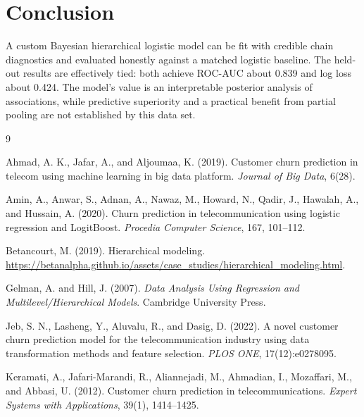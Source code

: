 \documentclass{article}
\begin{document}
\section{Conclusion}

A custom Bayesian hierarchical logistic model can be fit with credible chain diagnostics and evaluated honestly against a matched logistic baseline. The held-out results are effectively tied: both achieve ROC-AUC about 0.839 and log loss about 0.424. The model's value is an interpretable posterior analysis of associations, while predictive superiority and a practical benefit from partial pooling are not established by this data set.

\FloatBarrier

\begin{thebibliography}{9}

Ahmad, A. K., Jafar, A., and Aljoumaa, K. (2019).
\newblock Customer churn prediction in telecom using machine learning in big data platform.
\newblock \emph{Journal of Big Data}, 6(28).

Amin, A., Anwar, S., Adnan, A., Nawaz, M., Howard, N., Qadir, J., Hawalah, A., and Hussain, A. (2020).
\newblock Churn prediction in telecommunication using logistic regression and LogitBoost.
\newblock \emph{Procedia Computer Science}, 167, 101--112.

Betancourt, M. (2019).
\newblock Hierarchical modeling.
\newblock \url{https://betanalpha.github.io/assets/case_studies/hierarchical_modeling.html}.

Gelman, A. and Hill, J. (2007).
\newblock \emph{Data Analysis Using Regression and Multilevel/Hierarchical Models}.
\newblock Cambridge University Press.

Jeb, S. N., Lasheng, Y., Aluvalu, R., and Dasig, D. (2022).
\newblock A novel customer churn prediction model for the telecommunication industry using data transformation methods and feature selection.
\newblock \emph{PLOS ONE}, 17(12):e0278095.

Keramati, A., Jafari-Marandi, R., Aliannejadi, M., Ahmadian, I., Mozaffari, M., and Abbasi, U. (2012).
\newblock Customer churn prediction in telecommunications.
\newblock \emph{Expert Systems with Applications}, 39(1), 1414--1425.

\end{thebibliography}
\end{document}
